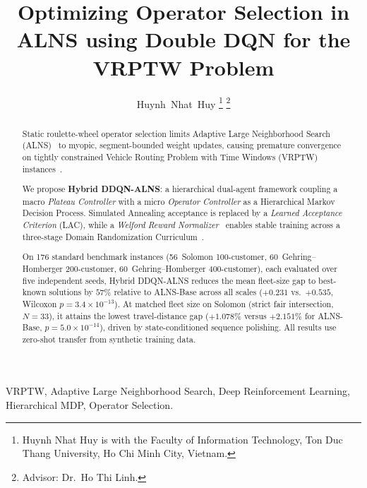 \documentclass[journal]{IEEEtran}
\begin{document}
\title{Optimizing Operator Selection in ALNS using Double DQN for the VRPTW Problem}

\author{Huynh~Nhat~Huy%
  \thanks{Huynh Nhat Huy is with the Faculty of Information Technology, Ton Duc Thang University, Ho Chi Minh City, Vietnam.}%
  \thanks{Advisor: Dr.~Ho Thi Linh.}}
\maketitle

\begin{abstract}
Static roulette-wheel operator selection limits Adaptive Large Neighborhood Search
(ALNS)~\cite{Ropke2006} to myopic, segment-bounded weight updates, causing
premature convergence on tightly constrained Vehicle Routing Problem with
Time Windows (VRPTW) instances~\cite{Dantzig1959}.

We propose \textbf{Hybrid DDQN-ALNS}: a hierarchical dual-agent framework
coupling a macro \emph{Plateau Controller} with a micro
\emph{Operator Controller} as a Hierarchical Markov Decision Process.  Simulated
Annealing acceptance is replaced by a \emph{Learned Acceptance Criterion} (LAC),
while a \emph{Welford Reward Normalizer}~\cite{welford1962} enables stable
training across a three-stage Domain Randomization Curriculum~\cite{tobin2017domain}.

On 176 standard benchmark instances (56~Solomon 100-customer,
60~Gehring--Homberger 200-customer, 60~Gehring--Homberger 400-customer),
each evaluated over five independent seeds, Hybrid DDQN-ALNS reduces the mean
fleet-size gap to best-known solutions by $57\%$ relative to ALNS-Base across
all scales ($+0.231$ vs.\ $+0.535$, Wilcoxon $p{=}3.4{\times}10^{-13}$).
At matched fleet size on Solomon (strict fair intersection, $N{=}33$), it
attains the lowest travel-distance gap ($\mathbf{+1.078\%}$ versus $+2.151\%$
for ALNS-Base, $p{=}5.0{\times}10^{-14}$), driven by state-conditioned
sequence polishing.  All results use zero-shot transfer from synthetic
training data.
\end{abstract}

\begin{IEEEkeywords}
VRPTW, Adaptive Large Neighborhood Search, Deep Reinforcement Learning,
Hierarchical MDP, Operator Selection.
\end{IEEEkeywords}
\end{document}
